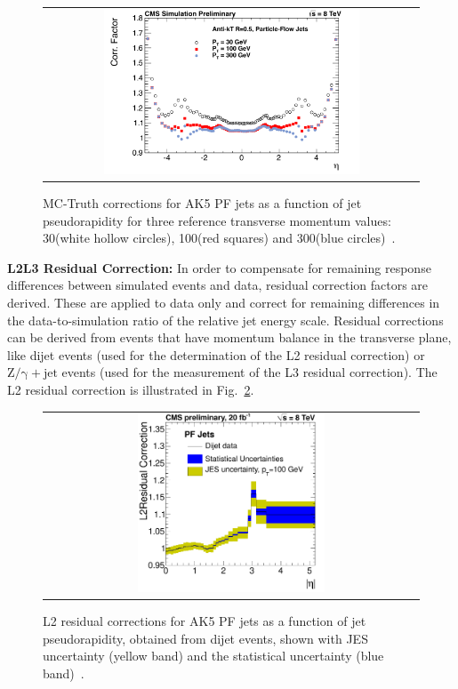 \begin{description}
\begin{figure}[!h]
  \centering 
  \begin{tabular}{c}
    \includegraphics[width=0.7\textwidth]{figures/CorrectionVsEta_Overview_TDR_ak5pfl1_L2L3.pdf} 
  \end{tabular}
  \caption{MC-Truth corrections for AK5 PF jets as a function of jet pseudorapidity for three reference transverse momentum values: 30\gev (white hollow circles), 100\gev (red squares) and 300\gev (blue circles)~\cite{CMS-DP-2013-033}.}
  \label{fig:l2l3}
\end{figure}
 \item \textbf{L2L3 Residual Correction:} In order to compensate for remaining response differences between simulated events and data, residual correction factors are derived. These are applied to data only and correct for remaining differences in the data-to-simulation ratio of the relative jet energy scale. Residual corrections can be derived from events that have momentum balance in the transverse plane, like dijet events (used for the determination of the L2 residual correction) or $\mathrm{Z/\gamma+jet}$ events (used for the measurement of the L3 residual correction). The L2 residual correction is illustrated in Fig.~\ref{fig:l2res}.
\begin{figure}[!h]
  \centering 
  \begin{tabular}{c}
    \includegraphics[width=0.51\textwidth]{figures/ResComp_FSRcorr_residuals_Abseta_PF_DiJetData.pdf} 
  \end{tabular}
  \caption{L2 residual corrections for AK5 PF jets as a function of jet pseudorapidity, obtained from dijet events, shown with JES uncertainty (yellow band) and the statistical uncertainty (blue band)~\cite{CMS-DP-2013-033}.}
  \label{fig:l2res}
\end{figure}

\end{description}
